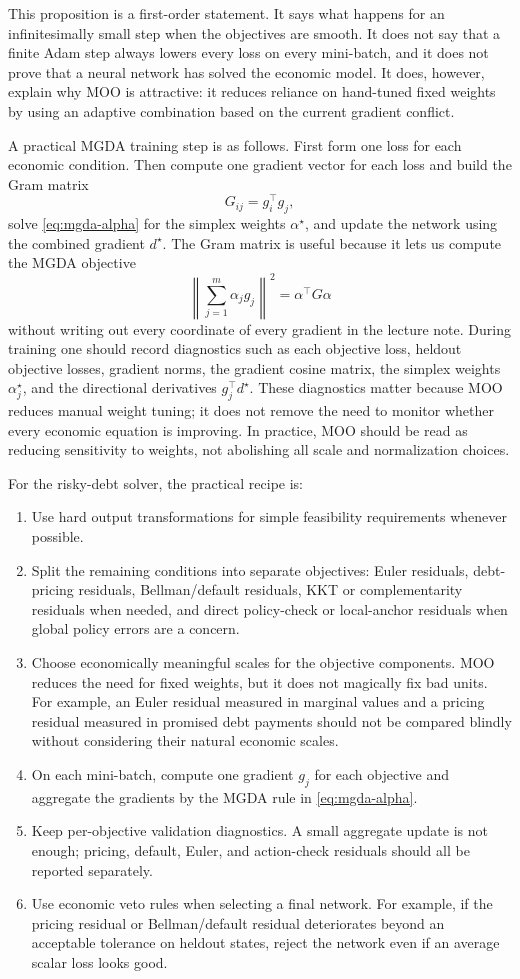 \documentclass[11pt]{article}
\newcommand{\1}{\mathbf{1}}
\begin{document}
This proposition is a first-order statement. It says what happens for an
infinitesimally small step when the objectives are smooth. It does not say that
a finite Adam step always lowers every loss on every mini-batch, and it does not
prove that a neural network has solved the economic model. It does, however,
explain why MOO is attractive: it reduces reliance on hand-tuned fixed weights
by using an adaptive combination based on the current gradient conflict.

A practical MGDA training step is as follows. First form one loss for each
economic condition. Then compute one gradient vector for each loss and build the
Gram matrix
\[
  G_{ij}=g_i^\top g_j,
\]
solve \cref{eq:mgda-alpha} for the simplex weights \(\alpha^\star\), and update
the network using the combined gradient \(d^\star\). The Gram matrix is useful
because it lets us compute the MGDA objective
\[
  \left\|\sum_{j=1}^m\alpha_j g_j\right\|^2
  =
  \alpha^\top G\alpha
\]
without writing out every coordinate of every gradient in the lecture note.
During training one should record diagnostics such as each objective loss,
heldout objective losses, gradient norms, the gradient cosine matrix, the
simplex weights \(\alpha_j^\star\), and the directional derivatives
\(g_j^\top d^\star\). These diagnostics matter because MOO reduces manual
weight tuning; it does not remove the need to monitor whether every economic
equation is improving. In practice, MOO should be read as reducing sensitivity
to weights, not abolishing all scale and normalization choices.

For the risky-debt solver, the practical recipe is:
\begin{enumerate}[leftmargin=2em]
  \item Use hard output transformations for simple feasibility requirements
  whenever possible.
  \item Split the remaining conditions into separate objectives: Euler
  residuals, debt-pricing residuals, Bellman/default residuals, KKT or
  complementarity residuals when needed, and direct policy-check or local-anchor
  residuals when global policy errors are a concern.
  \item Choose economically meaningful scales for the objective components.
  MOO reduces the need for fixed weights, but it does not magically fix bad
  units. For example, an Euler residual measured in marginal values and a
  pricing residual measured in promised debt payments should not be compared
  blindly without considering their natural economic scales.
  \item On each mini-batch, compute one gradient \(g_j\) for each objective and
  aggregate the gradients by the MGDA rule in \cref{eq:mgda-alpha}.
  \item Keep per-objective validation diagnostics. A small aggregate update is
  not enough; pricing, default, Euler, and action-check residuals should all be
  reported separately.
  \item Use economic veto rules when selecting a final network. For example, if
  the pricing residual or Bellman/default residual deteriorates beyond an
  acceptable tolerance on heldout states, reject the network even if an average
  scalar loss looks good.
\end{enumerate}
\end{document}
